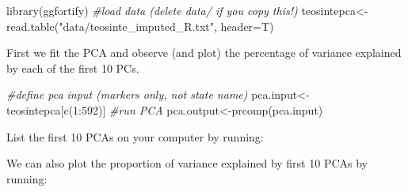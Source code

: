 \documentclass[
]{book}
\newenvironment{Shaded}{\begin{snugshade}}{\end{snugshade}}
\newcommand{\AttributeTok}[1]{\textcolor[rgb]{0.77,0.63,0.00}{#1}}
\newcommand{\CommentTok}[1]{\textcolor[rgb]{0.56,0.35,0.01}{\textit{#1}}}
\newcommand{\DecValTok}[1]{\textcolor[rgb]{0.00,0.00,0.81}{#1}}
\newcommand{\FloatTok}[1]{\textcolor[rgb]{0.00,0.00,0.81}{#1}}
\newcommand{\FunctionTok}[1]{\textcolor[rgb]{0.00,0.00,0.00}{#1}}
\newcommand{\NormalTok}[1]{#1}
\newcommand{\OtherTok}[1]{\textcolor[rgb]{0.56,0.35,0.01}{#1}}
\newcommand{\SpecialCharTok}[1]{\textcolor[rgb]{0.00,0.00,0.00}{#1}}
\newcommand{\StringTok}[1]{\textcolor[rgb]{0.31,0.60,0.02}{#1}}
\begin{document}
\begin{Shaded}
\begin{Highlighting}[]
\FunctionTok{library}\NormalTok{(ggfortify)}
\CommentTok{\#load data (delete \textquotesingle{}data/\textquotesingle{} if you copy this!)}
\NormalTok{teosintepca}\OtherTok{\textless{}{-}}\FunctionTok{read.table}\NormalTok{(}\StringTok{"data/teosinte\_imputed\_R.txt"}\NormalTok{, }\AttributeTok{header=}\NormalTok{T)}
\end{Highlighting}
\end{Shaded}

First we fit the PCA and observe (and plot) the percentage of variance explained by each of the first 10 PCs.

\begin{Shaded}
\begin{Highlighting}[]
\CommentTok{\#define pca input (markers only, not state name)}
\NormalTok{pca.input}\OtherTok{\textless{}{-}}\NormalTok{teosintepca[}\FunctionTok{c}\NormalTok{(}\DecValTok{1}\SpecialCharTok{:}\DecValTok{592}\NormalTok{)]}
\CommentTok{\#run PCA}
\NormalTok{pca.output}\OtherTok{\textless{}{-}}\FunctionTok{prcomp}\NormalTok{(pca.input)}
\end{Highlighting}
\end{Shaded}

List the first 10 PCAs on your computer by running:

\begin{Shaded}
\end{Shaded}

We can also plot the proportion of variance explained by first 10 PCAs by running:

\begin{Shaded}
\end{Shaded}
\end{document}
